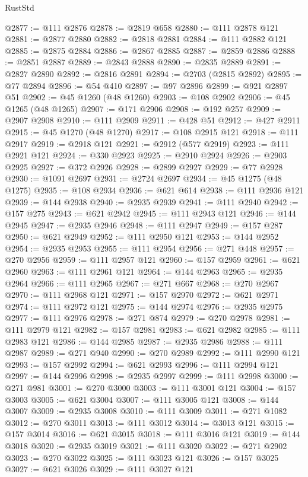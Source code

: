 \begin{lexlean}{RustStd}
\begin{coremodule}
@2877 := @111 @2876
@2878 := @2819 @658
@2880 := @111 @2878 @121
@2881 := @2877 @2880
@2882 := @2818 @2881
@2884 := @111 @2882 @121
@2885 := @2875 @2884
@2886 := @2867 @2885
@2887 := @2859 @2886
@2888 := @2851 @2887
@2889 := @2843 @2888
@2890 := @2835 @2889
@2891 := @2827 @2890
@2892 := @2816 @2891
@2894 := @2703 (@2815 @2892)
@2895 := @77 @2894
@2896 := @54 @410
@2897 := @97 @2896
@2899 := @921 @2897 @51
@2902 := @45 @1260 (@48 @1260)
@2903 := @108 @2902
@2906 := @45 @1265 (@48 @1265)
@2907 := @171 @2906
@2908 := @192 @257
@2909 := @2907 @2908
@2910 := @111 @2909
@2911 := @428 @51
@2912 := @427 @2911
@2915 := @45 @1270 (@48 @1270)
@2917 := @108 @2915 @121
@2918 := @111 @2917
@2919 := @2918 @121
@2921 := @2912 (@577 @2919)
@2923 := @111 @2921 @121
@2924 := @330 @2923
@2925 := @2910 @2924
@2926 := @2903 @2925
@2927 := @372 @2926
@2928 := @2899 @2927
@2929 := @77 @2928
@2930 := @1091 @2697
@2931 := @2724 @2697
@2934 := @45 @1275 (@48 @1275)
@2935 := @108 @2934
@2936 := @621 @614
@2938 := @111 @2936 @121
@2939 := @144 @2938
@2940 := @2935 @2939
@2941 := @111 @2940
@2942 := @157 @275
@2943 := @621 @2942
@2945 := @111 @2943 @121
@2946 := @144 @2945
@2947 := @2935 @2946
@2948 := @111 @2947
@2949 := @157 @287
@2950 := @621 @2949
@2952 := @111 @2950 @121
@2953 := @144 @2952
@2954 := @2935 @2953
@2955 := @111 @2954
@2956 := @271 @448
@2957 := @270 @2956
@2959 := @111 @2957 @121
@2960 := @157 @2959
@2961 := @621 @2960
@2963 := @111 @2961 @121
@2964 := @144 @2963
@2965 := @2935 @2964
@2966 := @111 @2965
@2967 := @271 @667
@2968 := @270 @2967
@2970 := @111 @2968 @121
@2971 := @157 @2970
@2972 := @621 @2971
@2974 := @111 @2972 @121
@2975 := @144 @2974
@2976 := @2935 @2975
@2977 := @111 @2976
@2978 := @271 @874
@2979 := @270 @2978
@2981 := @111 @2979 @121
@2982 := @157 @2981
@2983 := @621 @2982
@2985 := @111 @2983 @121
@2986 := @144 @2985
@2987 := @2935 @2986
@2988 := @111 @2987
@2989 := @271 @940
@2990 := @270 @2989
@2992 := @111 @2990 @121
@2993 := @157 @2992
@2994 := @621 @2993
@2996 := @111 @2994 @121
@2997 := @144 @2996
@2998 := @2935 @2997
@2999 := @111 @2998
@3000 := @271 @981
@3001 := @270 @3000
@3003 := @111 @3001 @121
@3004 := @157 @3003
@3005 := @621 @3004
@3007 := @111 @3005 @121
@3008 := @144 @3007
@3009 := @2935 @3008
@3010 := @111 @3009
@3011 := @271 @1082
@3012 := @270 @3011
@3013 := @111 @3012
@3014 := @3013 @121
@3015 := @157 @3014
@3016 := @621 @3015
@3018 := @111 @3016 @121
@3019 := @144 @3018
@3020 := @2935 @3019
@3021 := @111 @3020
@3022 := @271 @2902
@3023 := @270 @3022
@3025 := @111 @3023 @121
@3026 := @157 @3025
@3027 := @621 @3026
@3029 := @111 @3027 @121

\end{coremodule}
\end{lexlean}
